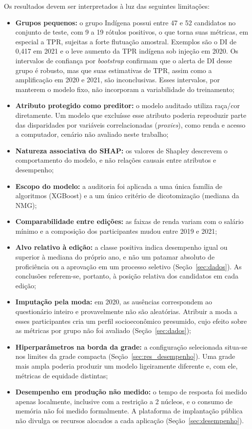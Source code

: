 Os resultados devem ser interpretados à luz das seguintes limitações:
\begin{itemize}
    \item \textbf{Grupos pequenos:} o grupo Indígena possui entre 47 e 52 candidatos no conjunto de teste, com 9 a 19 rótulos positivos, o que torna suas métricas, em especial a TPR, sujeitas a forte flutuação amostral. Exemplos são o DI de 0,417 em 2021 e o leve aumento da TPR indígena sob injeção em 2020. Os intervalos de confiança por \textit{bootstrap} confirmam que o alerta de DI desse grupo é robusto, mas que suas estimativas de TPR, assim como a amplificação em 2020 e 2021, são inconclusivas. Esses intervalos, por manterem o modelo fixo, não incorporam a variabilidade do treinamento;
    \item \textbf{Atributo protegido como preditor:} o modelo auditado utiliza raça/cor diretamente. Um modelo que excluísse esse atributo poderia reproduzir parte das disparidades por variáveis correlacionadas (\textit{proxies}), como renda e acesso a computador, cenário não avaliado neste trabalho;
    \item \textbf{Natureza associativa do SHAP:} os valores de Shapley descrevem o comportamento do modelo, e não relações causais entre atributos e desempenho;
    \item \textbf{Escopo do modelo:} a auditoria foi aplicada a uma única família de algoritmos (XGBoost) e a um único critério de dicotomização (mediana da NMG);
    \item \textbf{Comparabilidade entre edições:} as faixas de renda variam com o salário mínimo e a composição dos participantes mudou entre 2019 e 2021;
    \item \textbf{Alvo relativo à edição:} a classe positiva indica desempenho igual ou superior à mediana do próprio ano, e não um patamar absoluto de proficiência ou a aprovação em um processo seletivo (Seção~\ref{sec:dados}). As conclusões referem-se, portanto, à posição relativa dos candidatos em cada edição;
    \item \textbf{Imputação pela moda:} em 2020, as ausências correspondem ao questionário inteiro e provavelmente não são aleatórias. Atribuir a moda a esses participantes cria um perfil socioeconômico presumido, cujo efeito sobre as métricas por grupo não foi avaliado (Seção~\ref{sec:dados});
    \item \textbf{Hiperparâmetros na borda da grade:} a configuração selecionada situa-se nos limites da grade compacta (Seção~\ref{sec:res_desempenho}). Uma grade mais ampla poderia produzir um modelo ligeiramente diferente e, com ele, métricas de equidade distintas;
    \item \textbf{Desempenho em produção não medido:} o tempo de resposta foi medido apenas localmente, inclusive com a restrição a 2 núcleos, e o consumo de memória não foi medido formalmente. A plataforma de implantação pública não divulga os recursos alocados a cada aplicação (Seção~\ref{sec:desempenho}).
\end{itemize}

